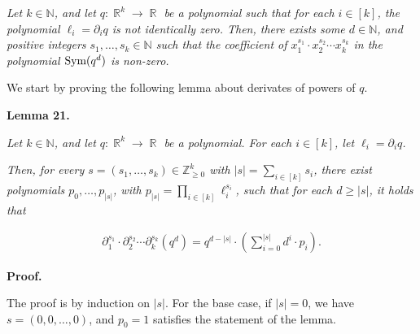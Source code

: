 \emph{Let $k\in\mathbb{N}$, and let $q:\mathop{\mathbb{R}}^{k}\to\mathop{\mathbb{R}}$ be a polynomial such that for each $i\in[k]$, the polynomial $\ell_{i}=\partial_{i}q$ is not identically zero.
Then, there exists some $d\in\mathbb{N}$, and positive integers $s_{1},\dots,s_{k}\in\mathbb{N}$ such that the coefficient of $x_{1}^{s_{1}}\cdot x_{2}^{s_{2}}\cdots x_{k}^{s_{k}}$ in the polynomial $\textnormal{Sym}(q^{d})$ is non-zero.}\par






We start by proving the following lemma about derivates of powers of $q$.\par





\par\medskip\noindent\textbf{
\textbf{Lemma 21}\textbf{.}
}\par



\emph{Let $k\in\mathbb{N}$, and let $q:\mathop{\mathbb{R}}^{k}\to\mathop{\mathbb{R}}$ be a polynomial. For each $i\in[k]$, let $\ell_{i}=\partial_{i}q$.}\par




\emph{Then, for every $s=(s_{1},\dots,s_{k})\in\mathbb{Z}_{\geqslant 0}^{k}$ with $\left|s\right|=\sum_{i\in[k]}s_{i}$, there exist polynomials $p_{0},\dots,p_{\left|s\right|}$, with $p_{\left|s\right|}=\prod_{i\in[k]}\ell_{i}^{s_{i}}$, such that for each $d\geqslant\left|s\right|$, it holds that}\par


\[\begin{gathered}
\partial_{1}^{s_{1}}\cdot\partial_{2}^{s_{2}}\cdots\partial_{k}^{s_{k}}\left(q^{d}\right)=q^{d-\left|s\right|}\cdot\left(\sum_{i=0}^{\left|s\right|}d^{i}\cdot p_{i}\right).
\end{gathered}\]






\par\medskip\noindent\textbf{Proof.}\par




The proof is by induction on $\left|s\right|$.
For the base case, if $\left|s\right|=0$, we have $s=(0,0,\dots,0)$, and $p_{0}=1$ satisfies the statement of the lemma.\par





